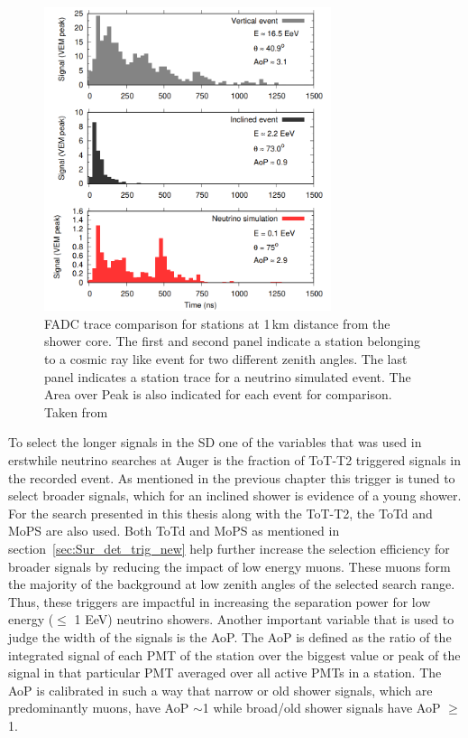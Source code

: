 \begin{figure}[t!]
  \centering
  \includegraphics[width=0.75\textwidth]{thesis_figures/Nu_analysis/Signal_trace_comp.png}
  \caption{FADC trace comparison for stations at 1\,km distance from the shower core. The first and second panel indicate a station belonging to a cosmic ray like event for two different zenith angles. The last panel indicates a station trace for a neutrino simulated event. The Area over Peak is also indicated for each event for comparison. Taken from~\cite{Aab_2019_diffuse}}
  \label{fig:Signal_trace_comp}
\end{figure}

To select the longer signals in the SD one of the variables that was used in erstwhile neutrino searches at Auger is the fraction of ToT-T2 triggered signals in the recorded event. As mentioned in the previous chapter this trigger is tuned to select broader signals, which for an inclined shower is evidence of a young shower. For the search presented in this thesis along with the ToT-T2, the ToTd and MoPS are also used. Both ToTd and MoPS as mentioned in section~\ref{sec:Sur_det_trig_new} help further increase the selection efficiency for broader signals by reducing the impact of low energy muons. These muons form the majority of the background at low zenith angles of the selected search range. Thus, these triggers are impactful in increasing the separation power for low energy ($\leq$ 1 EeV) neutrino showers. Another important variable that is used to judge the width of the signals is the \gls{AoP}. The AoP is defined as the ratio of the integrated signal of each PMT of the station over the biggest value or peak of the signal in that particular PMT averaged over all active PMTs in a station. The AoP is calibrated in such a way that narrow or old shower signals, which are predominantly muons, have AoP $\sim$1 while broad/old shower signals have AoP $\geqslant$ 1. 

